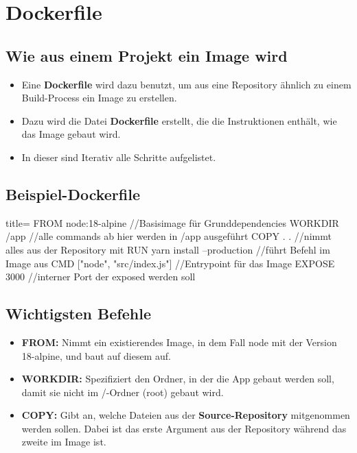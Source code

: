 \section{Dockerfile}\label{sec:dockerfile}
\subsection{Wie aus einem Projekt ein Image wird}

\begin{frame}
    \slidehead
    \Large
    \begin{itemize}[<+->]
        \item Eine \textbf{Dockerfile} wird dazu benutzt, um aus eine Repository ähnlich zu einem Build-Process
              ein Image zu erstellen.
        \item Dazu wird die Datei \textbf{Dockerfile} erstellt, die die Instruktionen enthält, wie das Image gebaut wird.
        \item In dieser sind Iterativ alle Schritte aufgelistet.
    \end{itemize}
\end{frame}

\subsection{Beispiel-Dockerfile}
\begin{frame}[fragile]
    \slidehead
    \centering
    \begin{codeBlock}{title=}
        FROM node:18-alpine //Basisimage für Grunddependencies
        WORKDIR /app //alle commands ab hier werden in /app ausgeführt
        COPY . . //nimmt alles aus der Repository mit
        RUN yarn install --production //führt Befehl im Image aus
        CMD ["node", "src/index.js"] //Entrypoint für das Image
        EXPOSE 3000 //interner Port der exposed werden soll
    \end{codeBlock}
\end{frame}

\subsection{Wichtigsten Befehle}

\begin{frame}
    \slidehead
    \Large
    \begin{itemize}[<+->]
        \item \textbf{FROM:} Nimmt ein existierendes Image, in dem Fall node mit der Version 18-alpine,
              und baut auf diesem auf.
        \item \textbf{WORKDIR: } Spezifiziert den Ordner, in der die App gebaut werden soll, damit sie nicht im
              /-Ordner (root) gebaut wird.
        \item \textbf{COPY: } Gibt an, welche Dateien aus der \textbf{Source-Repository} mitgenommen werden sollen.
              Dabei ist das erste Argument aus der Repository während das zweite im Image ist.
    \end{itemize}
\end{frame}

